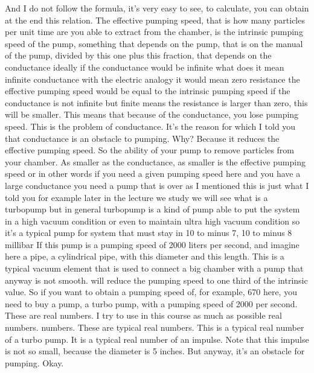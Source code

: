 And I do not follow the formula, it's very easy to see, to calculate, you can obtain at the end this relation. The effective pumping speed, that is how many particles per unit time are you able to extract from the chamber, is the intrinsic pumping speed of the pump, something that depends on the pump, that is on the manual of the pump, divided by this one plus this fraction, that depends on the conductance ideally if the conductance would be infinite what does it mean infinite conductance with the electric analogy it would mean zero resistance the effective pumping speed would be equal to the intrinsic pumping speed if the conductance is not infinite but finite means the resistance is larger than zero, this will be smaller. This means that because of the conductance, you lose pumping speed. This is the problem of conductance. It's the reason for which I told you that conductance is an obstacle to pumping. Why? Because it reduces the effective pumping speed. So the ability of your pump to remove particles from your chamber. As smaller as the conductance, as smaller is the effective pumping speed or in other words if you need a given pumping speed here and you have a large conductance you need a pump that is over as I mentioned this is just what I told you for example later in the lecture we study we will see what is a turbopump but in general turbopump is a kind of pump able to put the system in a high vacuum condition or even to maintain ultra high vacuum condition so it's a typical pump for system that must stay in 10 to minus 7, 10 to minus 8 millibar If this pump is a pumping speed of 2000 liters per second, and imagine here a pipe, a cylindrical pipe, with this diameter and this length. This is a typical vacuum element that is used to connect a big chamber with a pump that anyway is not smooth. will reduce the pumping speed to one third of the intrinsic value. So if you want to obtain a pumping speed of, for example, 670 here, you need to buy a pump, a turbo pump, with a pumping speed of 2000 per second. These are real numbers. I try to use in this course as much as possible real numbers. numbers. These are typical real numbers. This is a typical real number of a turbo pump. It is a typical real number of an impulse. Note that this impulse is not so small, because the diameter is 5 inches. But anyway, it's an obstacle for pumping. Okay.
